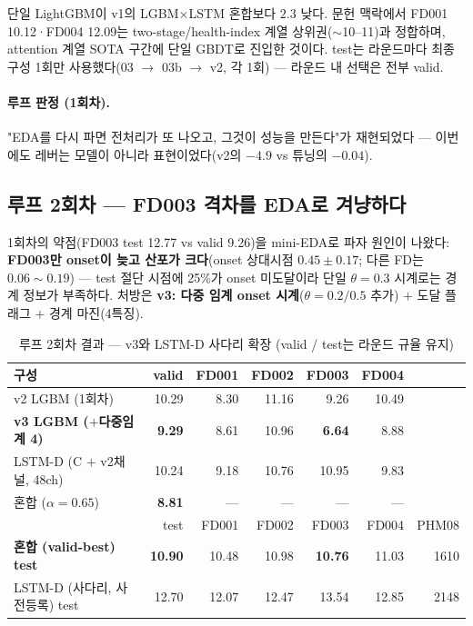 \documentclass[11pt]{article}
\begin{document}
단일 LightGBM이 v1의 LGBM$\times$LSTM 혼합보다 $2.3$ 낮다.
문헌 맥락에서 FD001 10.12·FD004 12.09는 two-stage/health-index 계열 상위권($\sim$10--11)과 정합하며,
attention 계열 SOTA 구간에 단일 GBDT로 진입한 것이다.
test는 라운드마다 최종 구성 1회만 사용했다(03 $\to$ 03b $\to$ v2, 각 1회) — 라운드 내 선택은 전부 valid.

\paragraph{루프 판정 (1회차).}
"EDA를 다시 파면 전처리가 또 나오고, 그것이 성능을 만든다"가 재현되었다 —
이번에도 레버는 모델이 아니라 표현이었다(v2의 $-4.9$ vs 튜닝의 $-0.04$).

\subsection{루프 2회차 — FD003 격차를 EDA로 겨냥하다}

1회차의 약점(FD003 test 12.77 vs valid 9.26)을 mini-EDA로 파자 원인이 나왔다:
\textbf{FD003만 onset이 늦고 산포가 크다}(onset 상대시점 $0.45\pm0.17$; 다른 FD는 $0.06\sim0.19$) —
test 절단 시점에 25\%가 onset 미도달이라 단일 $\theta{=}0.3$ 시계로는 경계 정보가 부족하다.
처방은 \textbf{v3: 다중 임계 onset 시계}($\theta{=}0.2/0.5$ 추가) $+$ 도달 플래그 $+$ 경계 마진(4특징).

\begin{table}[H]
\centering
\caption{루프 2회차 결과 — v3와 LSTM-D 사다리 확장 (valid / test는 라운드 규율 유지)}
\label{tab:loop2}
\begin{tabular}{lrrrrrr}
\toprule
구성 & valid & FD001 & FD002 & FD003 & FD004 & \\
\midrule
v2 LGBM (1회차) & 10.29 & 8.30 & 11.16 & 9.26 & 10.49 & \\
\textbf{v3 LGBM ($+$다중임계 4)} & \textbf{9.29} & 8.61 & 10.96 & \textbf{6.64} & 8.88 & \\
LSTM-D (C $+$ v2채널, 48ch) & 10.24 & 9.18 & 10.76 & 10.95 & 9.83 & \\
혼합 ($\alpha{=}0.65$) & \textbf{8.81} & — & — & — & — & \\
\midrule
 & test & FD001 & FD002 & FD003 & FD004 & PHM08 \\
\midrule
\textbf{혼합 (valid-best) test} & \textbf{10.90} & 10.48 & 10.98 & \textbf{10.76} & 11.03 & 1610 \\
LSTM-D (사다리, 사전등록) test & 12.70 & 12.07 & 12.47 & 13.54 & 12.85 & 2148 \\
\bottomrule
\end{tabular}
\end{table}
\end{document}
